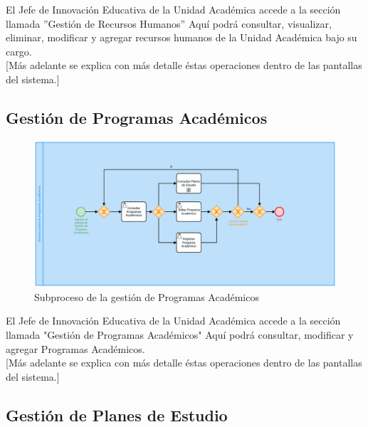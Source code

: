         El Jefe de Innovación Educativa de la Unidad Académica accede a la sección llamada ''Gestión de Recursos Humanos'' Aquí podrá consultar, visualizar, eliminar, modificar y agregar recursos humanos de la Unidad Académica bajo su cargo. \\

        [Más adelante se explica con más detalle éstas operaciones dentro de las pantallas del sistema.]\\
        \newpage
        \subsection{Gestión de Programas Académicos}

        \begin{figure}[H]
            \centering
            \hypertarget{BPMNGPA}{\includegraphics[width=\linewidth]{images/SP3/gestionPA.png}}
            \caption{Subproceso de la gestión de Programas Académicos}
            \label{BPMNGPA}
        \end{figure}

        El Jefe de Innovación Educativa de la Unidad Académica accede a la sección llamada "Gestión de Programas Académicos" Aquí podrá consultar, modificar y agregar Programas Académicos. \\

        [Más adelante se explica con más detalle éstas operaciones dentro de las pantallas del sistema.]\\
        \newpage
        \subsection{Gestión de Planes de Estudio}


